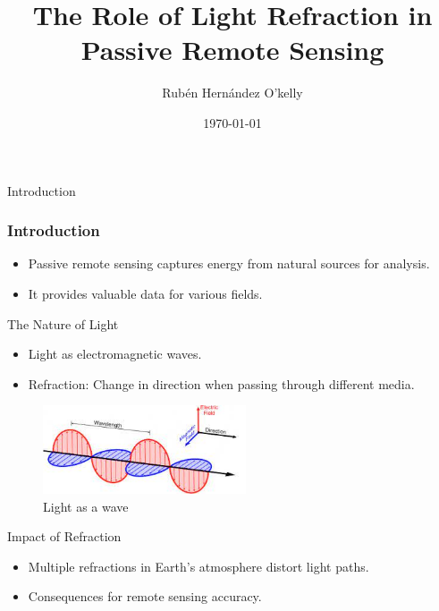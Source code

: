 \documentclass{beamer}
\begin{document}
\title{The Role of Light Refraction in Passive Remote Sensing}
\author{Rubén Hernández O'kelly}
\date{\today}

\begin{frame}
  \titlepage
\end{frame}

\begin{frame}{Introduction}
  \frametitle{Introduction}
  \begin{itemize}
    \item Passive remote sensing captures energy from natural sources for analysis.
    \item It provides valuable data for various fields.
  \end{itemize}
\end{frame}

\begin{frame}{The Nature of Light}
  \begin{itemize}
    \item Light as electromagnetic waves.
    \item Refraction: Change in direction when passing through different media.
  \end{itemize}

  \begin{figure}
    \centering
      \includegraphics[width=6cm]{LightWave.jpeg}
      \caption{Light as a wave}
      \label{fig:Light}
    \centering
  \end{figure}
\end{frame}

\begin{frame}{Impact of Refraction}
  \begin{itemize}
    \item Multiple refractions in Earth's atmosphere distort light paths.
    \item Consequences for remote sensing accuracy.
  \end{itemize}
\end{frame}
\end{document}
